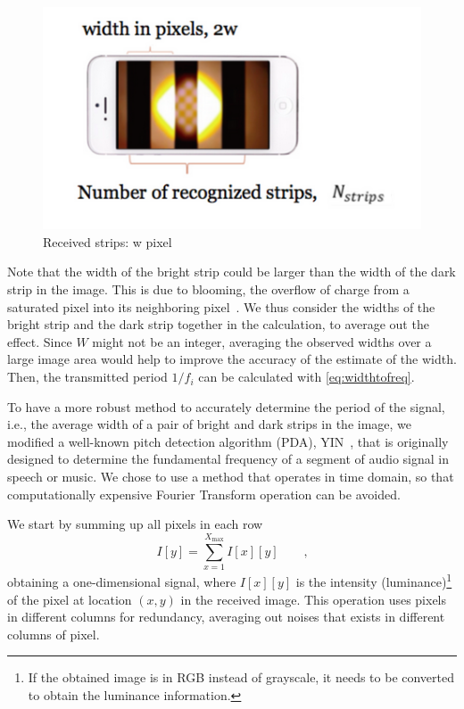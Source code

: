 \begin{figure}[!htb]
	\centering
	\includegraphics[scale=0.5]{fig/strip4.png}
	\caption{Received strips: w pixel}
	\label{fig:rx_strip}
\end{figure}

Note that the width of the bright strip could be larger than the width of the dark strip in the image. This is due to blooming, the overflow of charge from a saturated pixel into its neighboring pixel~\cite{el2005cmos}. We thus consider the widths of the bright strip and the dark strip together in the calculation, to average out the effect. Since $W$ might not be an integer, averaging the observed widths over a large image area would help to improve the accuracy of the estimate of the width. Then, the transmitted period $1/f_i$ can be calculated with \autoref{eq:widthtofreq}.

To have a more robust method to accurately determine the period of the signal, i.e., the average width of a pair of bright and dark strips in the image, we modified a well-known pitch detection algorithm (PDA), YIN~\cite{de2002yin}, that is originally designed to determine the fundamental frequency of a segment of audio signal in speech or music. We chose to use a method that operates in time domain, so that computationally expensive Fourier Transform operation can be avoided.

We start by summing up all pixels in each row
\begin{equation}
	I[y]=\sum^{X_{\max}}_{x=1} I[x][y] \qquad \textrm{,}
\end{equation}
obtaining a one-dimensional signal, where $I[x][y]$ is the intensity (luminance)\footnote{If the obtained image is in RGB instead of grayscale, it needs to be converted to obtain the luminance information.} of the pixel at location $(x,y)$ in the received image. This operation uses pixels in different columns for redundancy, averaging out noises that exists in different columns of pixel.

